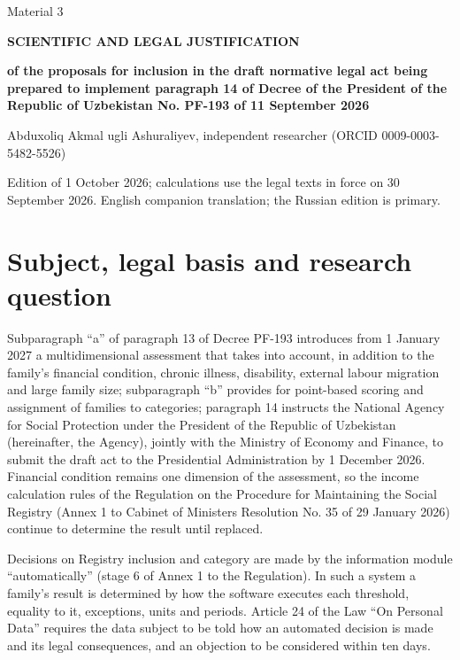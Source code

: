 \documentclass[12pt,a4paper]{extarticle}
\begin{document}
\begin{flushright}Material 3\end{flushright}
\begin{center}
\textbf{SCIENTIFIC AND LEGAL JUSTIFICATION}\par
\textbf{of the proposals for inclusion in the draft normative legal act being prepared to implement paragraph 14 of Decree of the President of the Republic of Uzbekistan No. PF-193 of 11 September 2026}\par
\medskip
Abduxoliq Akmal ugli Ashuraliyev, independent researcher (ORCID 0009-0003-5482-5526)\par
Edition of 1 October 2026; calculations use the legal texts in force on 30 September 2026. English companion translation; the Russian edition is primary.
\end{center}

\section{Subject, legal basis and research question}
Subparagraph “a” of paragraph 13 of Decree PF-193 introduces from 1 January 2027 a multidimensional assessment that takes into account, in addition to the family’s financial condition, chronic illness, disability, external labour migration and large family size; subparagraph “b” provides for point-based scoring and assignment of families to categories; paragraph 14 instructs the National Agency for Social Protection under the President of the Republic of Uzbekistan (hereinafter, the Agency), jointly with the Ministry of Economy and Finance, to submit the draft act to the Presidential Administration by 1 December 2026\cite{ref1}. Financial condition remains one dimension of the assessment, so the income calculation rules of the Regulation on the Procedure for Maintaining the Social Registry (Annex 1 to Cabinet of Ministers Resolution No. 35 of 29 January 2026) continue to determine the result until replaced\cite{ref2}.

Decisions on Registry inclusion and category are made by the information module “automatically” (stage 6 of Annex 1 to the Regulation)\cite{ref2}. In such a system a family’s result is determined by how the software executes each threshold, equality to it, exceptions, units and periods. Article 24 of the Law “On Personal Data” requires the data subject to be told how an automated decision is made and its legal consequences, and an objection to be considered within ten days\cite{ref9}.
\end{document}
